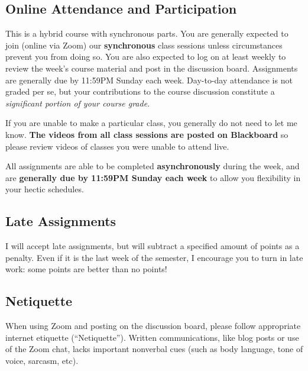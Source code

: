 \documentclass{article}
\begin{document}
\hypertarget{online-attendance-and-participation}{%
\subsection*{Online Attendance and
Participation}\label{online-attendance-and-participation}}

This is a hybrid course with synchronous parts. You are generally
expected to join (online via Zoom) our \textbf{synchronous} class
sessions unless circumstances prevent you from doing so. You are also
expected to log on at least weekly to review the week's course material
and post in the discussion board. Assignments are generally due by
11:59PM Sunday each week. Day-to-day attendance is not graded per se,
but your contributions to the course discussion constitute a
\emph{significant portion of your course grade.}

If you are unable to make a particular class, you generally do not need
to let me know. \textbf{The videos from all class sessions are posted on
Blackboard} so please review videos of classes you were unable to attend
live.

All assignments are able to be completed \textbf{asynchronously} during
the week, and are \textbf{generally due by 11:59PM Sunday each week} to
allow you flexibility in your hectic schedules.

\hypertarget{late-assignments}{%
\subsection*{Late Assignments}\label{late-assignments}}

I will accept late assignments, but will subtract a specified amount of
points as a penalty. Even if it is the last week of the semester, I
encourage you to turn in late work: some points are better than no
points!

\hypertarget{netiquette}{%
\subsection*{Netiquette}\label{netiquette}}

When using Zoom and posting on the discussion board, please follow
appropriate internet etiquette (``Netiquette''). Written communications,
like blog posts or use of the Zoom chat, lacks important nonverbal cues
(such as body language, tone of voice, sarcasm, etc).
\end{document}
